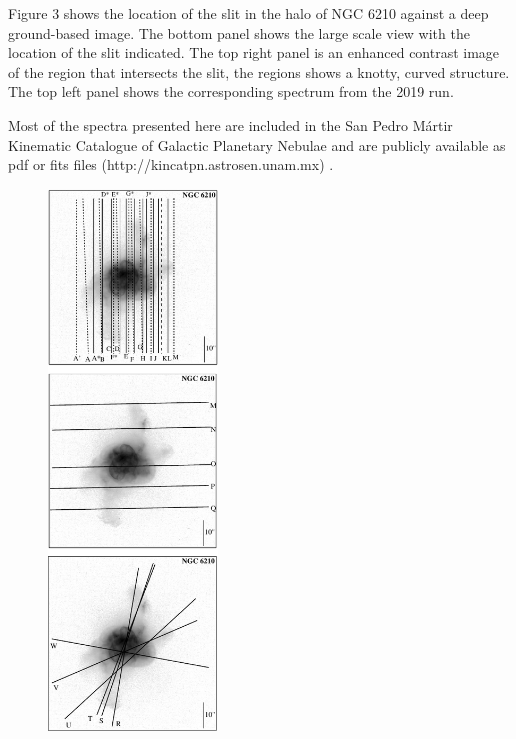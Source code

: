 \documentclass[useAMS, usenatbib]{mnras}
\begin{document}
Figure 3 shows the location of the slit in the halo of NGC 6210  against a deep ground-based image. The bottom panel shows the large scale view with the location of the slit indicated. The top right panel is an enhanced contrast image of the region that intersects the slit, the regions shows a knotty, curved structure. The top left panel shows the corresponding spectrum from the 2019 run.


Most of the spectra presented here are included in the San Pedro M\'artir Kinematic Catalogue of Galactic Planetary Nebulae and are publicly available as pdf or fits files (http://kincatpn.astrosen.unam.mx)
\citep{Lopez:2012a}.

 \begin{figure}
\centering
  \includegraphics[width=0.4\textwidth]{tere-figs/Figure2a}
  \caption{ }
\end{figure}
\end{document}
